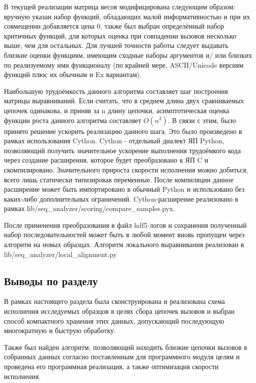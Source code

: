 В текущей реализации матрица весов модифицирована следующим образом: вручную указан набор функций, обладающих малой информативностью и при их совмещении добавляется цена 0, также был выбран определённый набор критичных функций, для которых оценка при совпадении вызовов несколько выше, чем для остальных. Для лучшей точности работы следует выдавать близкие оценки функциям, имеющим сходные наборы аргументов и/ или близких по реализуемому ими функционалу (по крайней мере, ASCII/Unicode версиям функций плюс их обычным и Ex вариантам).

Наибольшую трудоёмкость данного алгоритма составляет шаг построения матрицы выравниваний. Если считать, что в среднем длина двух сравниваемых цепочек одинакова, и приняв за n длину цепочки, асимптотическая оценка функции роста данного алгоритма составляет $O(n^2)$. В связи с этим, было принято решение ускорить реализацию данного шага. Это было произведено в рамках использования Cython. Cython - отдельный диалект ЯП Python, позволяющий получить значительное ускорение выполнения трудоёмкого кода через создание расширения, которое будет преобразовано к ЯП C и скомпилировано.  Значительного прироста скорости исполнения можно добиться, всего лишь статически типизировав переменные. После компиляции данное расширение может быть импортировано в обычный Python и использовано без каких-либо дополнительных ограничений. Cython-расширение реализовано в рамках lib/seq\_analyzer/scoring/compare\_samples.pyx.

После применения преобразования в файл hdf5 логов и сохранения полученный набор последовательностей может  быть в любой момент вновь пропущен через алгоритм на новых образцах. 
Алгоритм локального выравнивания реализован в lib/seq\_analyzer/local\_alignment.py
\subsection {Выводы по разделу}
В рамках настоящего раздела была сконструирована и реализована схема исполнения исследуемых образцов в целях сбора цепочек вызовов и выбран способ компактного хранения этих данных, допускающий последующую многократную и быструю обработку.

Также был найден алгоритм, позволяющий находить близкие цепочки вызовов в собранных данных согласно поставленным для программного модуля целям и проведена его программная реализация, а также оптимизация скорости исполнения.